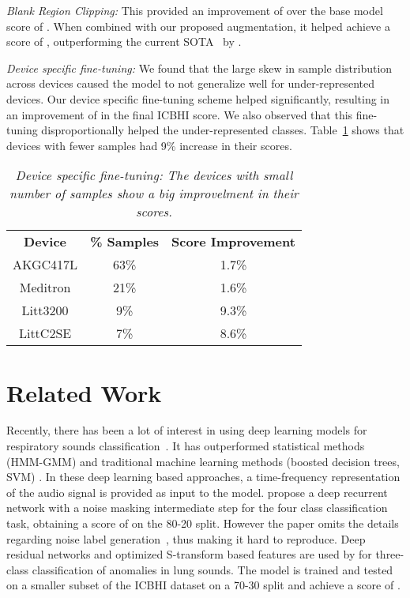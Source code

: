 \documentclass{article}
\begin{document}
\smallskip\noindent\textit{Blank Region Clipping:} This provided an improvement of  over the base model score of . When combined with our proposed augmentation, it helped achieve a score of , outperforming the current SOTA~\cite{acharya_20} by .

\smallskip\noindent\textit{Device specific fine-tuning:} We found that the large skew in sample distribution across devices caused the model to not generalize well for under-represented devices. Our device specific fine-tuning scheme helped significantly, resulting in an improvement of  in the final ICBHI score. We also observed that this fine-tuning disproportionally helped the under-represented classes. Table~\ref{tab:scores_device_wise} shows that devices with fewer samples had 9\% increase in their scores.

\begin{table}[htbp]
    \centering
\small
    \begin{tabular}{c | c | c}
    \toprule
	\textbf{Device} & \textbf{\% Samples}  & \textbf{Score Improvement} \\
    \cmidrule(lr){1-1}
    \cmidrule(lr){2-2}
    \cmidrule(lr){3-3}
    AKGC417L & 63\% & 1.7\%\\

    Meditron & 21\% &  1.6\%\\
   
    Litt3200 & 9\% &  9.3\%\\

    LittC2SE & 7\% & 8.6\%\\
    \bottomrule
    \end{tabular}
\vspace{-2mm}
    \caption{\textit{Device specific fine-tuning: The devices with small number of samples show a big improvelment in their scores.}}
    \label{tab:scores_device_wise}
    \vspace{-12pt}
\end{table}  \vspace{-3mm}
\section{Related Work}
\vspace{-2mm}
Recently, there has been a lot of interest in using deep learning models for respiratory sounds classification~\cite{acharya_20, lungrn_20, noise_rnn_koch_18}. It has outperformed statistical methods (HMM-GMM) \cite{jako_18} and traditional machine learning methods (boosted decision trees, SVM) \cite{chambres_18, serbes_18}. 
In these deep learning based approaches, a time-frequency representation of the audio signal is provided as input to the model. \citet{noise_rnn_koch_18} propose a deep recurrent network with a noise masking intermediate step for the four class classification task, obtaining a score of  on the 80-20 split. However the paper omits the details regarding noise label generation~\cite{acharya_20},
thus making it hard to reproduce.
Deep residual networks and optimized S-transform based features are used by \citet{triple_class_chen_19} for three-class classification of anomalies in lung sounds. The model is trained and tested on a smaller subset of the ICBHI dataset on a 70-30 split and achieve a score of .
\end{document}
